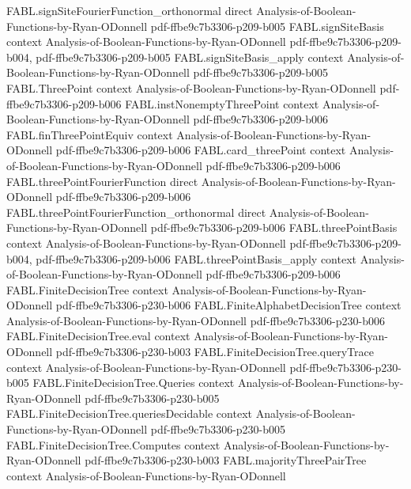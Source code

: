 \begin{theorem}
\proofstep
  {FABL.signSiteFourierFunction_orthonormal}
  {direct}
  {Analysis-of-Boolean-Functions-by-Ryan-ODonnell}
  {pdf-ffbe9c7b3306-p209-b005}
\proofstep
  {FABL.signSiteBasis}
  {context}
  {Analysis-of-Boolean-Functions-by-Ryan-ODonnell}
  {pdf-ffbe9c7b3306-p209-b004,
    pdf-ffbe9c7b3306-p209-b005}
\proofstep
  {FABL.signSiteBasis_apply}
  {context}
  {Analysis-of-Boolean-Functions-by-Ryan-ODonnell}
  {pdf-ffbe9c7b3306-p209-b005}
\proofstep
  {FABL.ThreePoint}
  {context}
  {Analysis-of-Boolean-Functions-by-Ryan-ODonnell}
  {pdf-ffbe9c7b3306-p209-b006}
\proofstep
  {FABL.instNonemptyThreePoint}
  {context}
  {Analysis-of-Boolean-Functions-by-Ryan-ODonnell}
  {pdf-ffbe9c7b3306-p209-b006}
\proofstep
  {FABL.finThreePointEquiv}
  {context}
  {Analysis-of-Boolean-Functions-by-Ryan-ODonnell}
  {pdf-ffbe9c7b3306-p209-b006}
\proofstep
  {FABL.card_threePoint}
  {context}
  {Analysis-of-Boolean-Functions-by-Ryan-ODonnell}
  {pdf-ffbe9c7b3306-p209-b006}
\proofstep
  {FABL.threePointFourierFunction}
  {direct}
  {Analysis-of-Boolean-Functions-by-Ryan-ODonnell}
  {pdf-ffbe9c7b3306-p209-b006}
\proofstep
  {FABL.threePointFourierFunction_orthonormal}
  {direct}
  {Analysis-of-Boolean-Functions-by-Ryan-ODonnell}
  {pdf-ffbe9c7b3306-p209-b006}
\proofstep
  {FABL.threePointBasis}
  {context}
  {Analysis-of-Boolean-Functions-by-Ryan-ODonnell}
  {pdf-ffbe9c7b3306-p209-b004,
    pdf-ffbe9c7b3306-p209-b006}
\proofstep
  {FABL.threePointBasis_apply}
  {context}
  {Analysis-of-Boolean-Functions-by-Ryan-ODonnell}
  {pdf-ffbe9c7b3306-p209-b006}
\proofstep
  {FABL.FiniteDecisionTree}
  {context}
  {Analysis-of-Boolean-Functions-by-Ryan-ODonnell}
  {pdf-ffbe9c7b3306-p230-b006}
\proofstep
  {FABL.FiniteAlphabetDecisionTree}
  {context}
  {Analysis-of-Boolean-Functions-by-Ryan-ODonnell}
  {pdf-ffbe9c7b3306-p230-b006}
\proofstep
  {FABL.FiniteDecisionTree.eval}
  {context}
  {Analysis-of-Boolean-Functions-by-Ryan-ODonnell}
  {pdf-ffbe9c7b3306-p230-b003}
\proofstep
  {FABL.FiniteDecisionTree.queryTrace}
  {context}
  {Analysis-of-Boolean-Functions-by-Ryan-ODonnell}
  {pdf-ffbe9c7b3306-p230-b005}
\proofstep
  {FABL.FiniteDecisionTree.Queries}
  {context}
  {Analysis-of-Boolean-Functions-by-Ryan-ODonnell}
  {pdf-ffbe9c7b3306-p230-b005}
\proofstep
  {FABL.FiniteDecisionTree.queriesDecidable}
  {context}
  {Analysis-of-Boolean-Functions-by-Ryan-ODonnell}
  {pdf-ffbe9c7b3306-p230-b005}
\proofstep
  {FABL.FiniteDecisionTree.Computes}
  {context}
  {Analysis-of-Boolean-Functions-by-Ryan-ODonnell}
  {pdf-ffbe9c7b3306-p230-b003}
\proofstep
  {FABL.majorityThreePairTree}
  {context}
  {Analysis-of-Boolean-Functions-by-Ryan-ODonnell}

\end{theorem}

